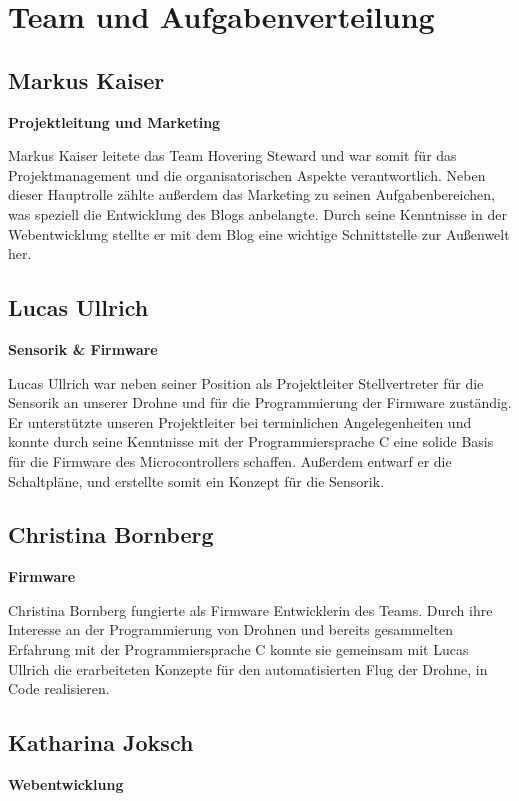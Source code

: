 \section{Team und Aufgabenverteilung}
  \subsection*{Markus Kaiser}
  \textbf{Projektleitung und Marketing}

  Markus Kaiser leitete das Team Hovering Steward und war somit für das Projektmanagement und
  die organisatorischen Aspekte verantwortlich. Neben dieser Hauptrolle zählte außerdem das Marketing
  zu seinen Aufgabenbereichen, was speziell die Entwicklung des Blogs anbelangte. Durch seine Kenntnisse
  in der Webentwicklung stellte er mit dem Blog eine wichtige Schnittstelle zur Außenwelt her.

  \subsection*{Lucas Ullrich}
  \textbf{Sensorik \& Firmware}

  Lucas Ullrich war neben seiner Position als Projektleiter Stellvertreter für die Sensorik an unserer Drohne und
  für die Programmierung der Firmware zuständig. Er unterstützte unseren Projektleiter bei terminlichen Angelegenheiten
  und konnte durch seine Kenntnisse mit der Programmiersprache C eine solide Basis für die Firmware des Microcontrollers schaffen.
  Außerdem entwarf er die Schaltpläne, und erstellte somit ein Konzept für die Sensorik.

  \subsection*{Christina Bornberg}
  \textbf{Firmware}

  Christina Bornberg fungierte als Firmware Entwicklerin des Teams. Durch ihre Interesse an der Programmierung von Drohnen
  und bereits gesammelten Erfahrung mit der Programmiersprache C konnte sie gemeinsam mit Lucas Ullrich die erarbeiteten Konzepte für
  den automatisierten Flug der Drohne, in Code realisieren.

  \subsection*{Katharina Joksch}
  \textbf{Webentwicklung}

